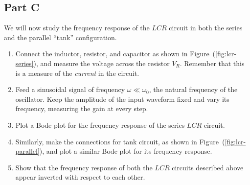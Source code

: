 \subsection*{Part C}

We will now study the frequency response of the $LCR$ circuit in both the series and the parallel ``tank'' configuration.

\begin{enumerate}
    \item Connect the inductor, resistor, and capacitor as shown in Figure~(\ref{fig:lcr-series}), and measure the voltage across the resistor $V_R$. Remember that this is a measure of the \textsl{current} in the circuit.
    \item Feed a sinusoidal signal of frequency $\omega \ll \omega_0$, the natural frequency of the oscillator. Keep the amplitude of the input waveform fixed and vary its frequency, measuring the gain at every step.
    \item Plot a Bode plot for the frequency response of the series $LCR$ circuit.
    
    \item Similarly, make the connections for tank circuit, as shown in Figure~(\ref{fig:lcr-parallel}), and plot a similar Bode plot for its frequency response.
    \item Show that the frequency response of both the $LCR$ circuits described above appear inverted with respect to each other.
\end{enumerate}
